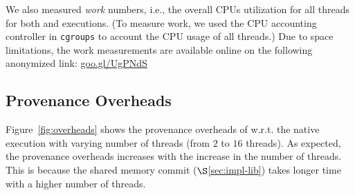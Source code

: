  We also measured  {\em work} numbers, i.e., the overall CPUs utilization for all threads for both \pthreads and \projecttitle executions. (To measure work, we used the CPU accounting controller in {\tt cgroups} to account the CPU usage of all threads.) Due to space limitations, the work measurements are available online on the following anonymized link:  \href{https://goo.gl/UgPNdS}{goo.gl/UgPNdS}





\subsection{Provenance Overheads}
\label{subsec:overheads}

Figure~\ref{fig:overheads} shows the provenance overheads of \projecttitle w.r.t. the native \pthreads execution with varying number of
threads (from $2$ to $16$ threads). As expected, the provenance overheads increases with the increase in the number of threads. This is because the shared memory commit ($\S$\ref{sec:impl-lib}) takes longer time with a higher number of threads. 

